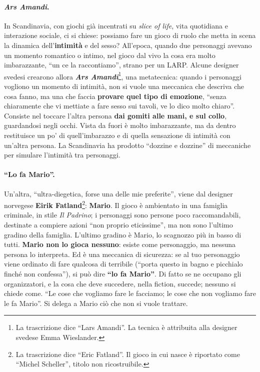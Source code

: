 \paragraph{\emph{Ars Amandi}.} In Scandinavia, con giochi già incentrati su
\emph{slice of life}, vita quotidiana e interazione sociale, ci si chiese: possiamo
fare un gioco di ruolo che metta in scena la dinamica dell'\textbf{intimità} e del
sesso? All'epoca, quando due personaggi avevano un momento romantico o intimo, nel
gioco dal vivo la cosa era molto imbarazzante, ``un ce la raccontiamo'', strano per
un LARP. Alcune designer svedesi crearono allora \textbf{\emph{Ars
Amandi}}\footnote{La trascrizione dice ``Lars Amandi''. La tecnica è attribuita alla
designer svedese Emma Wieslander.}, una metatecnica: quando i personaggi vogliono un
momento di intimità, non si vuole una meccanica che descriva che cosa fanno, ma una
che faccia \textbf{provare quel tipo di emozione}, ``senza chiaramente che vi mettiate
a fare sesso sui tavoli, ve lo dico molto chiaro''. Consiste nel toccare l'altra
persona \textbf{dai gomiti alle mani, e sul collo}, guardandosi negli occhi. Vista da
fuori è molto imbarazzante, ma da dentro restituisce un po' di quell'imbarazzo e di
quella sensazione di intimità con un'altra persona. La Scandinavia ha prodotto
``dozzine e dozzine'' di meccaniche per simulare l'intimità tra personaggi.

\paragraph{``Lo fa Mario''.} Un'altra, ``ultra-diegetica, forse una delle mie
preferite'', viene dal designer norvegese \textbf{Eirik Fatland}\footnote{La
trascrizione dice ``Eric Fatland''. Il gioco in cui nasce è riportato come
``Michel Scheller'', titolo non ricostruibile.}: \textbf{Mario}. Il gioco è ambientato
in una famiglia criminale, in stile \emph{Il Padrino}; i personaggi sono persone poco
raccomandabili, destinate a compiere azioni ``non proprio eticissime'', ma non sono
l'ultimo gradino della famiglia. L'ultimo gradino è Mario, lo scagnozzo più in basso
di tutti. \textbf{Mario non lo gioca nessuno}: esiste come personaggio, ma nessuna
persona lo interpreta. Ed è una meccanica di sicurezza: se al tuo personaggio viene
ordinato di fare qualcosa di terribile (``porta questo in bagno e picchialo finché non
confessa''), si può dire \textbf{``lo fa Mario''}. Di fatto se ne occupano gli
organizzatori, e la cosa che deve succedere, nella fiction, succede; nessuno si chiede
come. ``Le cose che vogliamo fare le facciamo; le cose che non vogliamo fare le fa
Mario''. Si delega a Mario ciò che non si vuole trattare.

